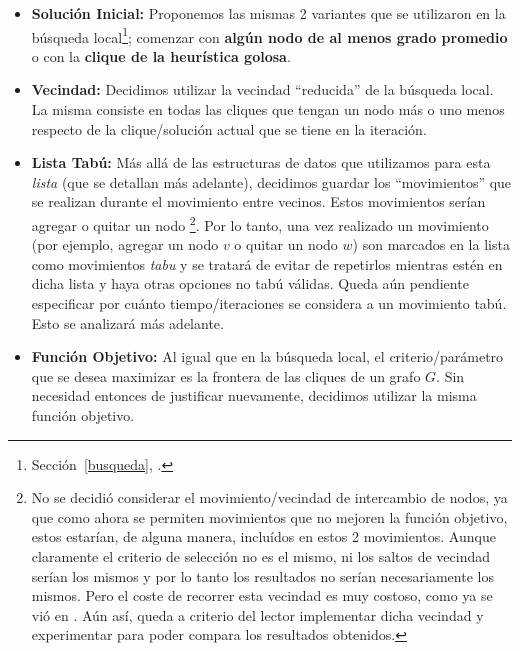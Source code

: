 \begin{itemize}
    \item \textbf{Soluci\'on Inicial: } Proponemos las mismas 2 variantes que
        se utilizaron en la b\'usqueda local\footnote{Secci\'on~\ref{busqueda},
        \emph{}.};
        comenzar con \textbf{alg\'un nodo de al menos grado promedio} o con
        la \textbf{clique de la heur\'istica golosa}.

    \item \textbf{Vecindad: } Decidimos utilizar la vecindad ``reducida'' de
        la b\'usqueda local. La misma consiste en todas las cliques que tengan
        un nodo m\'as o uno menos respecto de la clique/soluci\'on actual
        que se tiene en la iteraci\'on.

    \item \textbf{Lista Tab\'u: } M\'as all\'a de las estructuras de datos
        que utilizamos para esta \emph{lista} (que se detallan m\'as adelante),
        decidimos guardar los ``movimientos'' que se realizan durante el movimiento
        entre vecinos. Estos movimientos ser\'ian agregar o quitar un nodo%
        \footnote{No se decidi\'o considerar el movimiento/vecindad de intercambio
        de nodos, ya que como ahora se permiten movimientos que no mejoren la
        funci\'on objetivo, estos estar\'ian, de alguna manera, inclu\'idos en
        estos 2 movimientos. Aunque claramente el criterio de selecci\'on no
        es el mismo, ni los saltos de vecindad ser\'ian los mismos y por lo tanto
        los resultados no ser\'ian necesariamente los mismos. Pero el coste
        de recorrer esta vecindad es muy costoso, como ya se vi\'o en
        \emph{}. A\'un as\'i, queda a criterio
        del lector implementar dicha vecindad y experimentar para poder compara
        los resultados obtenidos.}. Por lo tanto, una vez realizado un movimiento
        (por ejemplo, agregar un nodo $v$ o quitar un nodo $w$) son marcados
        en la lista como movimientos \emph{tabu} y se tratar\'a de evitar
        de repetirlos mientras est\'en en dicha lista y haya otras opciones
        no tab\'u v\'alidas. Queda a\'un pendiente especificar por cu\'anto
        tiempo/iteraciones se considera a un movimiento tab\'u. Esto
        se analizar\'a m\'as adelante.

    \item \textbf{Funci\'on Objetivo: } Al igual que en la b\'usqueda local,
        el criterio/par\'ametro que se desea maximizar es la frontera de
        las cliques de un grafo $G$. Sin necesidad entonces de justificar
        nuevamente, decidimos utilizar la misma funci\'on objetivo.


\end{itemize}
